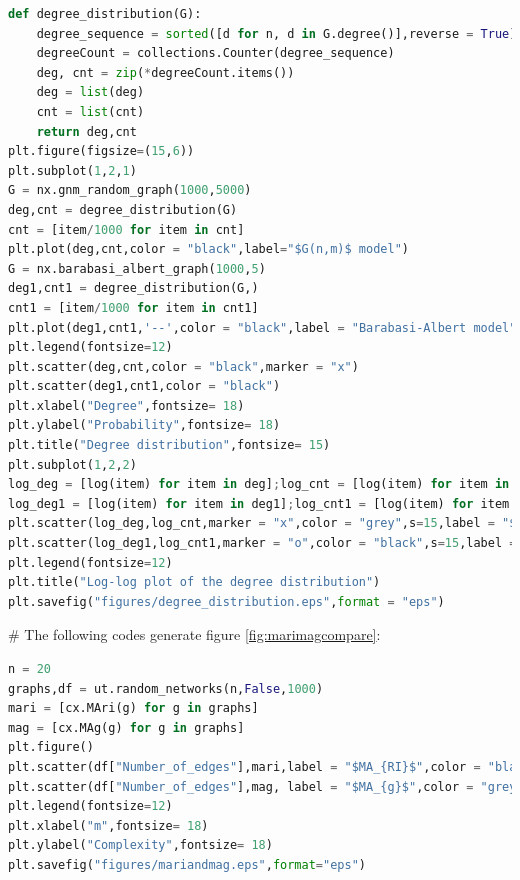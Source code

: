 \documentclass[12pt]{article}
\begin{document}
\begin{lstlisting}[breaklines=true,language=Python]
def degree_distribution(G):
    degree_sequence = sorted([d for n, d in G.degree()],reverse = True)
    degreeCount = collections.Counter(degree_sequence)
    deg, cnt = zip(*degreeCount.items())
    deg = list(deg)
    cnt = list(cnt)
    return deg,cnt
plt.figure(figsize=(15,6))
plt.subplot(1,2,1)
G = nx.gnm_random_graph(1000,5000)
deg,cnt = degree_distribution(G)
cnt = [item/1000 for item in cnt]
plt.plot(deg,cnt,color = "black",label="$G(n,m)$ model")
G = nx.barabasi_albert_graph(1000,5)
deg1,cnt1 = degree_distribution(G,)
cnt1 = [item/1000 for item in cnt1]
plt.plot(deg1,cnt1,'--',color = "black",label = "Barabasi-Albert model")
plt.legend(fontsize=12)
plt.scatter(deg,cnt,color = "black",marker = "x")
plt.scatter(deg1,cnt1,color = "black")
plt.xlabel("Degree",fontsize= 18)
plt.ylabel("Probability",fontsize= 18)
plt.title("Degree distribution",fontsize= 15)
plt.subplot(1,2,2)
log_deg = [log(item) for item in deg];log_cnt = [log(item) for item in cnt]
log_deg1 = [log(item) for item in deg1];log_cnt1 = [log(item) for item in cnt1]
plt.scatter(log_deg,log_cnt,marker = "x",color = "grey",s=15,label = "$G(n,m) model$")
plt.scatter(log_deg1,log_cnt1,marker = "o",color = "black",s=15,label = "Barabasi-Albert model")
plt.legend(fontsize=12)
plt.title("Log-log plot of the degree distribution")
plt.savefig("figures/degree_distribution.eps",format = "eps")
\end{lstlisting}
\noindent
\newline
\# The following codes generate figure \ref{fig:marimagcompare}:
\begin{lstlisting}[breaklines=true,language=Python]
n = 20
graphs,df = ut.random_networks(n,False,1000)
mari = [cx.MAri(g) for g in graphs]
mag = [cx.MAg(g) for g in graphs]
plt.figure()
plt.scatter(df["Number_of_edges"],mari,label = "$MA_{RI}$",color = "black",marker = "o",s=10)
plt.scatter(df["Number_of_edges"],mag, label = "$MA_{g}$",color = "grey",marker = "x",s=10)
plt.legend(fontsize=12)
plt.xlabel("m",fontsize= 18)
plt.ylabel("Complexity",fontsize= 18)
plt.savefig("figures/mariandmag.eps",format="eps")
\end{lstlisting}
\end{document}
